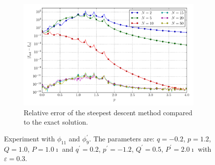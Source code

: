 \documentclass[a4paper,10pt]{article}
\begin{document}
\begin{figure}[ht!]
\begin{subfigure}[t]{0.5\linewidth}
    \includegraphics[width=\linewidth]{./plots/tp_1d_conv_p_11_9_err_rel_nsd.pdf}
    \caption{Relative error of the steepest descent method compared to the exact solution.}
    \label{fig:tp_1d_conv_p_11_9_err_nsd}
  \end{subfigure}
  \label{fig:tp_1d_conv_p_2_1}
  \caption{Experiment with $\phi_{11}$ and $\phi_{9}^{\prime}$.
  The parameters are:
  $q=-0.2$, $p=1.2$, $Q=1.0$, $P=1.0\imath$ and
  $q^\prime=0.2$, $p^\prime=-1.2$, $Q^\prime=0.5$, $P^\prime=2.0\imath$
  with $\varepsilon=0.3$.}
\end{figure}
\end{document}
